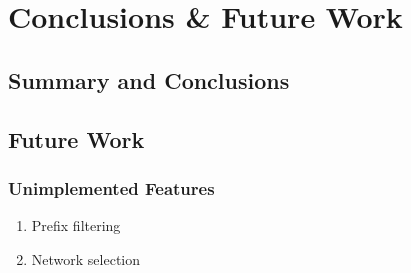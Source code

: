 \chapter{Conclusions \& Future Work}

\section{Summary and Conclusions}

\section{Future Work}
	\subsection{Unimplemented Features}
	\begin{enumerate}
		\item Prefix filtering
		\item Network selection
	\end{enumerate}